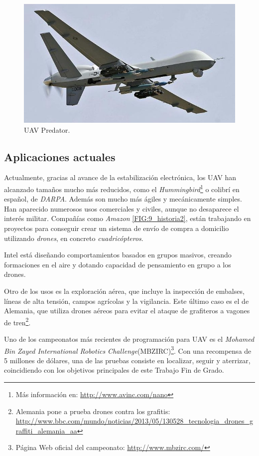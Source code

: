 \begin{figure}[hbtp]
	\centering
	\includegraphics[scale=0.25]{imag/predator.jpg}
	\caption{UAV Predator.}
	
	\label{FIG:8_historia2}
\end{figure}

\subsection{Aplicaciones actuales}

Actualmente, gracias al avance de la estabilización electrónica, los UAV han alcanzado tamaños mucho más reducidos, como el \textit{Hummingbird}\footnote{Más información en: \url{http://www.avinc.com/nano}} o colibrí en español, de \textit{DARPA}. Además son mucho más ágiles y mecánicamente simples. Han aparecido numerosos usos comerciales y civiles, aunque no desaparece el interés militar. Compañías como \textit{Amazon} \ref{FIG:9_historia2}, están trabajando en proyectos para conseguir crear un sistema de envío de compra a domicilio utilizando \textit{drones}, en concreto \textit{cuadricópteros}.
 
Intel está diseñando comportamientos basados en grupos masivos, creando formaciones en el aire y dotando capacidad de pensamiento en grupo a los drones.
 
Otro de los usos es la exploración aérea, que incluye la inspección de embalses, líneas de alta tensión, campos agrícolas y la vigilancia. Este último caso es el de Alemania, que utiliza drones aéreos para evitar el ataque de grafiteros a vagones de tren\footnote{Alemania pone a prueba drones contra los grafitis: \url{http://www.bbc.com/mundo/noticias/2013/05/130528_tecnologia_drones_graffiti_alemania_aa}}.

Uno de los campeonatos más recientes de programación para UAV es el \textit{Mohamed Bin Zayed International Robotics Challenge}(MBZIRC)\footnote{Página Web oficial del campeonato: \url{http://www.mbzirc.com/}}. Con una recompensa de 5 millones de dólares, una de las pruebas consiste en localizar, seguir y aterrizar, coincidiendo con los objetivos principales de este Trabajo Fin de Grado.

